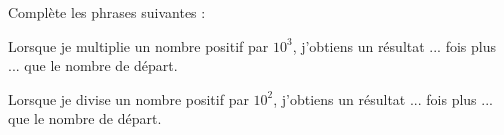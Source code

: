 \begin{exercice}[]
Complète les phrases suivantes :

\begin{colenumerate}{1} 
\item Lorsque je multiplie un nombre positif par $10^3$, j'obtiens un résultat ... fois plus ... que le nombre de départ.
\item Lorsque je divise un nombre positif par $10^2$, j'obtiens un résultat ... fois plus ... que le nombre de départ.
\end{colenumerate}
\end{exercice}
